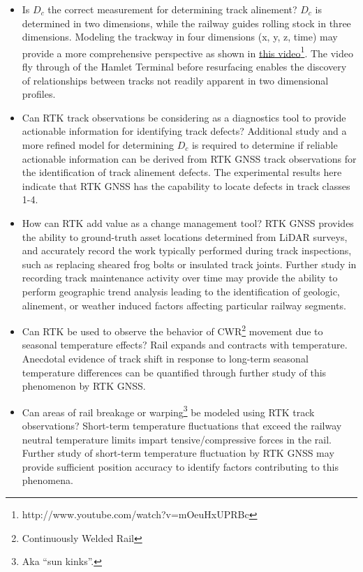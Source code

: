 \begin{itemize}
\item
Is ${D_c}$ the correct measurement for determining track alinement? ${D_c}$ is determined in two dimensions, while the railway guides rolling stock in three dimensions. Modeling the trackway in four dimensions (x, y, z, time) may provide a more comprehensive perspective as shown in \href{http://www.youtube.com/watch?v=mOeuHxUPRBc}{this video}\footnote{http://www.youtube.com/watch?v=mOeuHxUPRBc}. The video fly through of the Hamlet Terminal before resurfacing enables the discovery of relationships between tracks not readily apparent in two dimensional profiles.

\item
Can RTK track observations be considering as a diagnostics tool to provide actionable information for identifying track defects? Additional study and a more refined model for determining ${D_c}$ is required to determine if reliable actionable information can be derived from RTK GNSS track observations for the identification of track alinement defects. The experimental results here indicate that RTK GNSS has the capability to locate defects in track classes 1-4.

\item
How can RTK add value as a change management tool? RTK GNSS provides the ability to ground-truth asset locations determined from LiDAR surveys, and accurately record the work typically performed during track inspections, such as replacing sheared frog bolts or insulated track joints. Further study in recording track maintenance activity over time may provide the ability to perform geographic trend analysis leading to the identification of geologic, alinement, or weather induced factors affecting particular railway segments.

\item
Can RTK be used to observe the behavior of CWR\footnote{Continuously Welded Rail} movement due to seasonal temperature effects? Rail expands and contracts with temperature. Anecdotal evidence of track shift in response to long-term seasonal temperature differences can be quantified through further study of this phenomenon by RTK GNSS.

\item
Can areas of rail breakage or warping\footnote{Aka ``sun kinks''.} be modeled using RTK track observations? Short-term temperature fluctuations that exceed the railway neutral temperature limits impart tensive/compressive forces in the rail. Further study of short-term temperature fluctuation by RTK GNSS may provide sufficient position accuracy to identify factors contributing to this phenomena.


\end{itemize}
